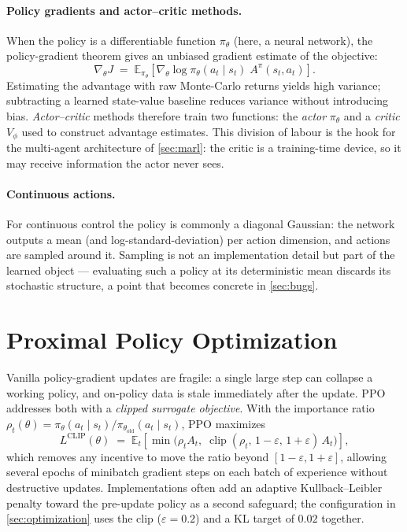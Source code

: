 \paragraph{Policy gradients and actor--critic methods.}
When the policy is a differentiable function $\pi_{\theta}$ (here, a
neural network), the policy-gradient theorem gives an unbiased gradient
estimate of the objective:
\begin{equation}
  \nabla_{\theta} J \;=\;
  \mathbb{E}_{\pi_{\theta}}\!\left[\nabla_{\theta}
  \log \pi_{\theta}(a_t \mid s_t)\; A^{\pi}(s_t, a_t)\right].
\end{equation}
Estimating the advantage with raw Monte-Carlo returns yields high
variance; subtracting a learned state-value baseline reduces variance
without introducing bias. \emph{Actor--critic} methods therefore train
two functions: the \emph{actor} $\pi_{\theta}$ and a \emph{critic}
$V_{\phi}$ used to construct advantage estimates. This division of labour
is the hook for the multi-agent architecture of \cref{sec:marl}: the
critic is a training-time device, so it may receive information the
actor never sees.

\paragraph{Continuous actions.}
For continuous control the policy is commonly a diagonal Gaussian: the
network outputs a mean (and log-standard-deviation) per action dimension,
and actions are sampled around it. Sampling is not an implementation
detail but part of the learned object --- evaluating such a policy at its
deterministic mean discards its stochastic structure, a point that
becomes concrete in \cref{sec:bugs}.

\section{Proximal Policy Optimization}
\label{sec:ppo}

Vanilla policy-gradient updates are fragile: a single large step can
collapse a working policy, and on-policy data is stale immediately after
the update. PPO~\cite{schulman2017ppo} addresses both with a
\emph{clipped surrogate objective}. With the importance ratio
$\rho_t(\theta) = \pi_{\theta}(a_t \mid s_t) / \pi_{\theta_{\text{old}}}(a_t \mid s_t)$,
PPO maximizes
\begin{equation}
  L^{\mathrm{CLIP}}(\theta) \;=\;
  \mathbb{E}_t\!\left[\min\bigl(\rho_t A_t,\;
  \operatorname{clip}(\rho_t,\, 1-\varepsilon,\, 1+\varepsilon)\, A_t\bigr)\right],
\end{equation}
which removes any incentive to move the ratio beyond
$[1-\varepsilon, 1+\varepsilon]$, allowing several epochs of minibatch
gradient steps on each batch of experience without destructive updates.
Implementations often add an adaptive Kullback--Leibler penalty toward
the pre-update policy as a second safeguard; the configuration in
\cref{sec:optimization} uses the clip ($\varepsilon = 0.2$) and a KL
target of $0.02$ together.

